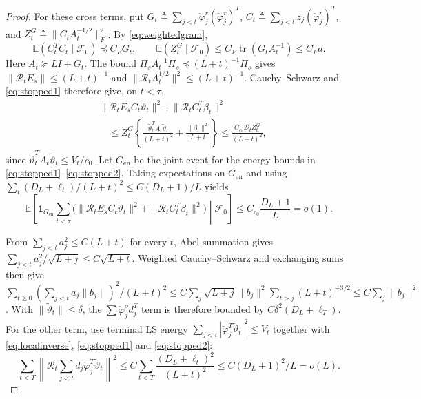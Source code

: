 \documentclass[11pt,reqno]{amsart}
\numberwithin{equation}{section}
\theoremstyle{definition}
\theoremstyle{remark}
\newcommand{\E}{\mathbb E}
\newcommand{\F}{\mathcal F}
\newcommand{\phc}{\check{\varphi}}
\newcommand{\etac}{\widetilde{\vartheta}}
\newcommand{\tr}{\operatorname{tr}}
\newcommand{\ind}{\mathbf 1}
\begin{document}
\begin{proof}
For these cross terms, put
$G_t\triangleq\sum_{j<t}\phc_j^r(\phc_j^r)^T$,
$C_t\triangleq\sum_{j<t}z_j(\phc_j^r)^T$, and
$Z_t^G\triangleq\|C_tA_t^{-1/2}\|_F^2$.
By \eqref{eq:weightedgram},
\begin{equation*}
 \E(C_t^T C_t\mid\F_0)\preceq C_FG_t,
 \qquad \E(Z_t^G\mid\F_0)\le C_F\tr(G_tA_t^{-1})\le C_Fd.
\end{equation*}
Here $A_t\succeq LI+G_t$.
The bound
$\Pi_sA_t^{-1}\Pi_s\preceq(L+t)^{-1}\Pi_s$ gives
$\|\mathcal R_tE_s\|\le(L+t)^{-1}$ and
$\|\mathcal R_tA_t^{1/2}\|^2\le(L+t)^{-1}$.
Cauchy--Schwarz and \eqref{eq:stopped1} therefore give, on $t<\tau$,
\[
 \begin{split}
 &\|\mathcal R_tE_sC_t\etac_t\|^2+\|\mathcal R_tC_t^T\beta_t\|^2\\
 &\quad\le Z_t^G\left\{\frac{\etac_t^T A_t\etac_t}{(L+t)^2}
             +\frac{\|\beta_t\|^2}{L+t}\right\}
 \le\frac{C_{c_0}\mathcal D_t Z_t^G}{(L+t)^2},
 \end{split}
\]
since $\etac_t^T A_t\etac_t\le V_t/c_0$.
Let $G_{\mathrm{en}}$ be the joint event for the energy bounds in \eqref{eq:stopped1}--\eqref{eq:stopped2}. Taking expectations on $G_{\mathrm{en}}$ and using
$\sum_t(D_L+\ell_t)/(L+t)^2\le C(D_L+1)/L$ yields
\begin{equation*}
 \E\left[\ind_{G_{\mathrm{en}}}\sum_{t<\tau}
 \bigl(\|\mathcal R_tE_sC_t\etac_t\|^2+
 \|\mathcal R_tC_t^T\beta_t\|^2\bigr)\middle|\F_0\right]
 \le C_{c_0}\frac{D_L+1}{L}=o(1).
\end{equation*}

From $\sum_{j<t}a_j^2\le C(L+t)$ for every $t$, Abel summation gives $\sum_{j<t}a_j^2/\sqrt{L+j}\le C\sqrt{L+t}$. Weighted Cauchy--Schwarz and exchanging sums then give $\sum_{t\ge0}(\sum_{j<t}a_j\|b_j\|)^2/(L+t)^2\le C\sum_j\sqrt{L+j}\|b_j\|^2\sum_{t>j}(L+t)^{-3/2}\le C\sum_j\|b_j\|^2$.
With $\|\etac_t\|\le\delta$, the
$\sum\phc_j^od_j^T$ term is therefore bounded by
$C\delta^2(D_L+\ell_T)$.
For the other term, use terminal LS energy $\sum_{j<t}|\phc_j^T\etac_t|^2\le V_t$ together with \eqref{eq:localinverse}, \eqref{eq:stopped1} and \eqref{eq:stopped2}:
\[
 \sum_{t<T}\left\|\mathcal R_t\sum_{j<t}d_j\phc_j^T
 \etac_t\right\|^2
 \le C\sum_{t<T}\frac{(D_L+\ell_t)^2}{(L+t)^2}
 \le C(D_L+1)^2/L=o(L).
\]


\end{proof}
\end{document}
